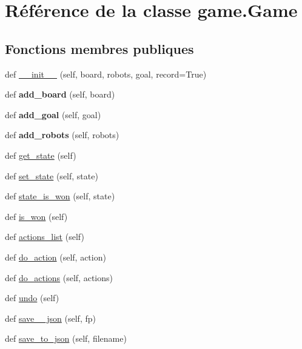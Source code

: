 \hypertarget{classgame_1_1Game}{}\section{Référence de la classe game.\+Game}
\label{classgame_1_1Game}
\subsection*{Fonctions membres publiques}
\begin{DoxyCompactItemize}
\item 
def \hyperlink{classgame_1_1Game_af5743a4c7beabed4dd5dea74a39bbb99}{\+\_\+\+\_\+init\+\_\+\+\_\+} (self, board, robots, goal, record=True)
\item 
\mbox{\label{classgame_1_1Game_a2ccf23306726654420eec1a50f67d1cb}} 
def {\bfseries add\+\_\+board} (self, board)
\item 
\mbox{\label{classgame_1_1Game_a7465d51560b2d485db6ed53907cf1397}} 
def {\bfseries add\+\_\+goal} (self, goal)
\item 
\mbox{\label{classgame_1_1Game_a7e642c0246cea6fa82e92247fa4c3b93}} 
def {\bfseries add\+\_\+robots} (self, robots)
\item 
def \hyperlink{classgame_1_1Game_aaa2b3e9d8578764bc3eda7ab5841ecbb}{get\+\_\+state} (self)
\item 
def \hyperlink{classgame_1_1Game_a7e87798fb7f81b80c11fcaec17860577}{set\+\_\+state} (self, state)
\item 
def \hyperlink{classgame_1_1Game_a9ae72edd1264e1effe875ec1af8051f9}{state\+\_\+is\+\_\+won} (self, state)
\item 
def \hyperlink{classgame_1_1Game_a0fc708c9734c5a42e3461188580efcd1}{is\+\_\+won} (self)
\item 
def \hyperlink{classgame_1_1Game_a485f03c6330c2bb3284638de65b6cae0}{actions\+\_\+list} (self)
\item 
def \hyperlink{classgame_1_1Game_a2c3428bb9f61284ee0febe00d7850dfa}{do\+\_\+action} (self, action)
\item 
def \hyperlink{classgame_1_1Game_a62f9d3a23be4b342ee35e56cdaf073a3}{do\+\_\+actions} (self, actions)
\item 
def \hyperlink{classgame_1_1Game_a4d05280a8e739b214f50168a7f60c782}{undo} (self)
\item 
def \hyperlink{classgame_1_1Game_a2d8234f8916943384bf5f756b616fe55}{save\+\_\+\_\+json} (self, fp)
\item 
def \hyperlink{classgame_1_1Game_a7c525e5a47b01fb5bed17fe1438c13f5}{save\+\_\+to\+\_\+json} (self, filename)
\end{DoxyCompactItemize}
